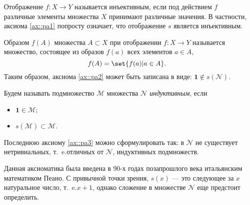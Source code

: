\documentclass{article}
\newcommand{\ie}{т{.}~e{.}}
\begin{document}
\begin{remark}
    Отображение \(f \colon X \to Y\) называется инъективным, если под действием $f$ различные элементы множества $X$ принимают различные значения. В частности, аксиома \ref{ax::pa1} попросту означает, что отображение \(s\) является инъективным.
\end{remark}
\begin{remark}
    Образом \( f(A) \) множества \( A \subset X \) при отображении \(f \colon X \to Y \) называется множество, состоящее из образов \( f(a) \) всех элементов \( a \in A \),
    \[
        f(A) = \set{ f(a) |  a \in A }.
    \]
    Таким образом, аксиома \ref{ax::pa2} может быть записана в виде: \( \mathbf{1} \notin s(\mathcal{N}) \).
\end{remark}

\begin{definition}
    Будем называть подмножество \( \mathcal{M} \) множества \(\mathcal{N} \) \textit{индуктивным}, если
    \begin{itemize}[noitemsep, topsep=0pt,parsep=0pt]
        \item \( \mathbf{1} \in \mathcal{M} \);
        \item \( s(\mathcal{M}) \subset \mathcal{M} \).
    \end{itemize}
\end{definition}
\begin{remark}
    Последнюю аксиому \ref{ax::pa3} можно сформулировать так: в \( \mathcal{N} \) не существует нетривиальных, \ie отличных от \( \mathcal{N} \), индуктивных подмножеств.    
\end{remark}

Данная аксиоматика была введена в 90-х годах позапрошлого века итальянским математиком Пеано. С привычной точки зрения, \( s(x) \) --- это следующее за \( x \) натуральное число, \ie \( x + 1 \), однако сложение в множестве \( \mathcal{N} \) еще предстоит определить.
\end{document}
